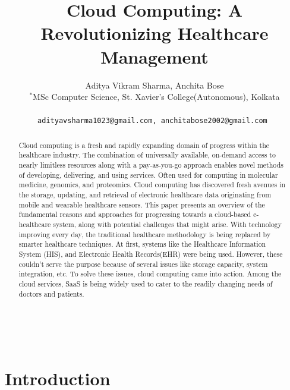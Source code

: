 \documentclass{article}
\title{Cloud Computing: A Revolutionizing Healthcare Management}
\author{Aditya Vikram Sharma,  Anchita Bose\\
        \small $^{*}$MSc Computer Science, St. Xavier's College(Autonomous), Kolkata \\\\
        \small \tt{adityavsharma1023@gmail.com,}
        \tt{anchitabose2002@gmail.com}
}
\date{} %
\begin{document}
\maketitle

\begin{abstract} 
\noindent Cloud computing is a fresh and rapidly expanding domain of progress within the healthcare industry. The combination of universally available, on-demand access to nearly limitless resources along with a pay-as-you-go approach enables novel methods of developing, delivering, and using services. Often used for computing in molecular medicine, genomics, and proteomics. Cloud computing has discovered fresh avenues in the storage, updating, and retrieval of electronic healthcare data originating from mobile and wearable healthcare sensors.
This paper presents an overview of the fundamental reasons and approaches for progressing towards a cloud-based e-healthcare system, along with potential challenges that might arise.
With technology improving every day, the traditional healthcare methodology is being replaced by smarter healthcare techniques.
At first, systems like the Healthcare Information System (HIS), and Electronic Health Records(EHR) were being used. However, these couldn't serve the purpose because of several issues like storage capacity, system integration, etc. To solve these issues, cloud computing came into action. Among the cloud services, SaaS is being widely used to cater to the readily changing needs of doctors and patients. 
\end{abstract}

\noindent{}\\

\section{Introduction}
\end{document}
